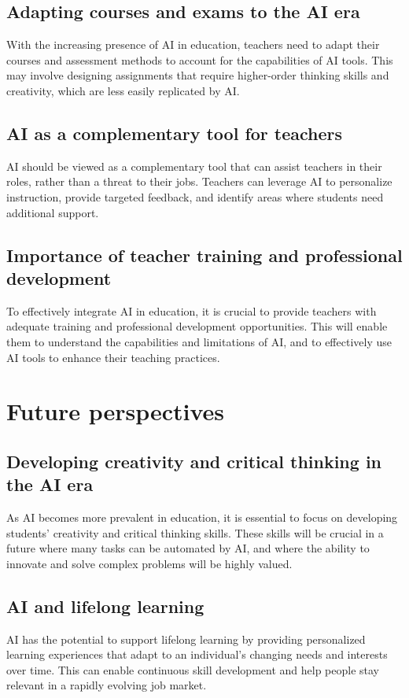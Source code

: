 \documentclass{article}
\begin{document}
\subsection{Adapting courses and exams to the AI era}
With the increasing presence of AI in education, teachers need to adapt their courses and assessment methods to account for the capabilities of AI tools. This may involve designing assignments that require higher-order thinking skills and creativity, which are less easily replicated by AI.

\subsection{AI as a complementary tool for teachers}
AI should be viewed as a complementary tool that can assist teachers in their roles, rather than a threat to their jobs. Teachers can leverage AI to personalize instruction, provide targeted feedback, and identify areas where students need additional support.

\subsection{Importance of teacher training and professional development}
To effectively integrate AI in education, it is crucial to provide teachers with adequate training and professional development opportunities. This will enable them to understand the capabilities and limitations of AI, and to effectively use AI tools to enhance their teaching practices.

\newpage
\section{Future perspectives}

\subsection{Developing creativity and critical thinking in the AI era}
As AI becomes more prevalent in education, it is essential to focus on developing students' creativity and critical thinking skills. These skills will be crucial in a future where many tasks can be automated by AI, and where the ability to innovate and solve complex problems will be highly valued.

\subsection{AI and lifelong learning}
AI has the potential to support lifelong learning by providing personalized learning experiences that adapt to an individual's changing needs and interests over time. This can enable continuous skill development and help people stay relevant in a rapidly evolving job market.
\end{document}
